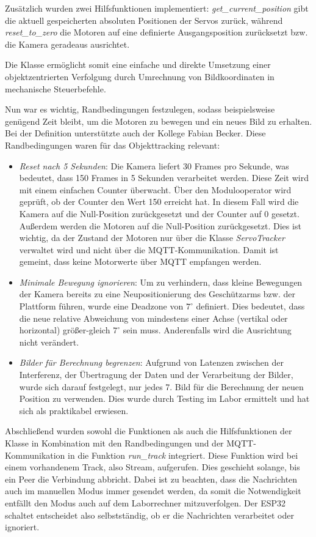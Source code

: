 Zusätzlich wurden zwei Hilfsfunktionen implementiert: \textit{get\_current\_position} gibt die aktuell gespeicherten absoluten Positionen der Servos zurück, während \textit{reset\_to\_zero} die Motoren auf eine definierte Ausgangsposition zurücksetzt bzw. die Kamera geradeaus ausrichtet. \newline

Die Klasse ermöglicht somit eine einfache und direkte Umsetzung einer objektzentrierten Verfolgung durch Umrechnung von Bildkoordinaten in mechanische Steuerbefehle. \newline

Nun war es wichtig, Randbedingungen festzulegen, sodass beispielsweise genügend Zeit bleibt, um die Motoren zu bewegen und ein neues Bild zu erhalten. Bei der Definition unterstützte auch der Kollege Fabian Becker. Diese Randbedingungen waren für das Objekttracking relevant:

\begin{itemize}
    \item \textit{Reset nach 5 Sekunden}: Die Kamera liefert 30 Frames pro Sekunde, was bedeutet, dass 150 Frames in 5 Sekunden verarbeitet werden. Diese Zeit wird mit einem einfachen Counter überwacht. Über den Modulooperator wird geprüft, ob der Counter den Wert 150 erreicht hat. In diesem Fall wird die Kamera auf die Null-Position zurückgesetzt und der Counter auf 0 gesetzt. Außerdem werden die Motoren auf die Null-Position zurückgesetzt. Dies ist wichtig, da der Zustand der Motoren nur über die Klasse \textit{ServoTracker} verwaltet wird und nicht über die MQTT-Kommunikation. Damit ist gemeint, dass keine Motorwerte über MQTT empfangen werden.
    
    \item \textit{Minimale Bewegung ignorieren}: Um zu verhindern, dass kleine Bewegungen der Kamera bereits zu eine Neupositionierung des Geschützarms bzw. der Plattform führen, wurde eine Deadzone von $7^\circ$ definiert. Dies bedeutet, dass die neue relative Abweichung von mindestens einer Achse (vertikal oder horizontal) größer-gleich $7^\circ$ sein muss. Anderenfalls wird die Ausrichtung nicht verändert.
    
    \item \textit{Bilder für Berechnung begrenzen}: Aufgrund von Latenzen zwischen der Interferenz, der Übertragung der Daten und der Verarbeitung der Bilder, wurde sich darauf festgelegt, nur jedes 7. Bild für die Berechnung der neuen Position zu verwenden. Dies wurde durch Testing im Labor ermittelt und hat sich als praktikabel erwiesen.
\end{itemize}

Abschließend wurden sowohl die Funktionen als auch die Hilfsfunktionen der Klasse in Kombination mit den Randbedingungen und der MQTT-Kommunikation in die Funktion \textit{run\_track} integriert. Diese Funktion wird bei einem vorhandenem Track, also Stream, aufgerufen. Dies geschieht solange, bis ein Peer die Verbindung abbricht. Dabei ist zu beachten, dass die Nachrichten auch im manuellen Modus immer gesendet werden, da somit die Notwendigkeit entfällt den Modus auch auf dem Laborrechner mitzuverfolgen. Der ESP32 schaltet entscheidet also selbstständig, ob er die Nachrichten verarbeitet oder ignoriert. 